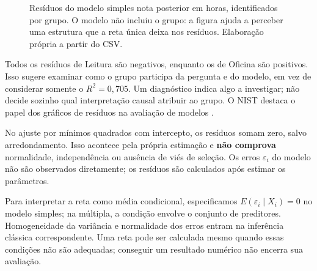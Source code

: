 \begin{figure}[H]
\centering
{}
\caption{Resíduos do modelo simples nota posterior em horas, identificados por grupo. O modelo não incluiu o grupo: a figura ajuda a perceber uma estrutura que a reta única deixa nos resíduos. Elaboração própria a partir do CSV.}
\label{fig:residuos-notas}
\end{figure}

Todos os resíduos de Leitura são negativos, enquanto os de Oficina são positivos. Isso sugere examinar como o grupo participa da pergunta e do modelo, em vez de considerar somente o $R^2=0{,}705$. Um diagnóstico indica algo a investigar; não decide sozinho qual interpretação causal atribuir ao grupo. O NIST destaca o papel dos gráficos de resíduos na avaliação de modelos \parencite{NISTDiagnostico}.

No ajuste por mínimos quadrados com intercepto, os resíduos somam zero, salvo arredondamento. Isso acontece pela própria estimação e \textbf{não comprova} normalidade, independência ou ausência de viés de seleção. Os erros $\varepsilon_i$ do modelo não são observados diretamente; os resíduos são calculados após estimar os parâmetros.

Para interpretar a reta como média condicional, especificamos $E(\varepsilon_i\mid X_i)=0$ no modelo simples; na múltipla, a condição envolve o conjunto de preditores. Homogeneidade da variância e normalidade dos erros entram na inferência clássica correspondente. Uma reta pode ser calculada mesmo quando essas condições não são adequadas; conseguir um resultado numérico não encerra sua avaliação.


